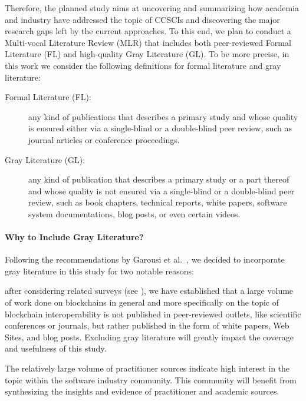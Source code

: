 \documentclass[review]{elsarticle}
\begin{document}
Therefore, the planned study aims at uncovering and summarizing how academia and industry have addressed the topic of CCSCIs and discovering the major research gaps left by the current approaches.
To this end, we plan to conduct a Multi-vocal Literature Review (MLR) that includes both peer-reviewed Formal Literature (FL) and high-quality Gray Literature (GL).
To be more precise, in this work we consider the following definitions for formal literature and gray literature:
\begin{description}
	\item[Formal Literature (FL):] any kind of publications that describes a primary study and whose quality is ensured either via a single-blind or a double-blind peer review, such as journal articles or conference proceedings.
	
	\item[Gray Literature (GL):] any kind of publication that describes a primary study or a part thereof and whose quality is not ensured via a single-blind or a double-blind peer review, such as book chapters, technical reports, white papers, software system documentations, blog posts, or even certain videos.
\end{description}


\paragraph{Why to Include Gray Literature?}
Following the recommendations by Garousi et al.~\cite{Garousi2017MLR}, we decided to incorporate gray literature in this study for two notable reasons:
\begin{inparaenum}[(i)]
	\item after considering related surveys (see ), we have established that a large volume of work done on blockchains in general and more specifically on the topic of blockchain interoperability is not published in peer-reviewed outlets, like scientific conferences or journals, but rather published in the form of white papers, Web Sites, and blog posts.
	Excluding gray literature will greatly impact the coverage and usefulness of this study.
	\item The relatively large volume of practitioner sources indicate high interest in the topic within the software industry community.
	This community will benefit from synthesizing the insights and evidence of practitioner and academic sources.	
\end{inparaenum}
\end{document}
